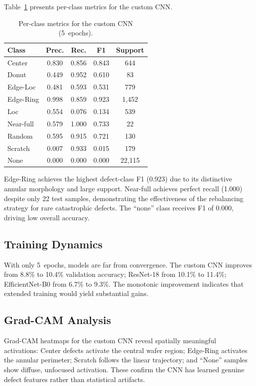 \documentclass[conference]{IEEEtran}
\begin{document}
Table~\ref{tab:per_class} presents per-class metrics for the custom CNN.

\begin{table}[H]
\centering
\caption{Per-class metrics for the custom CNN (5~epochs).}
\label{tab:per_class}
\begin{tabular}{@{}lcccc@{}}
\toprule
\textbf{Class} & \textbf{Prec.} & \textbf{Rec.} & \textbf{F1}
               & \textbf{Support} \\
\midrule
Center      & 0.830 & 0.856 & 0.843 & 644 \\
Donut       & 0.449 & 0.952 & 0.610 & 83 \\
Edge-Loc    & 0.481 & 0.593 & 0.531 & 779 \\
Edge-Ring   & 0.998 & 0.859 & 0.923 & 1{,}452 \\
Loc         & 0.554 & 0.076 & 0.134 & 539 \\
Near-full   & 0.579 & 1.000 & 0.733 & 22 \\
Random      & 0.595 & 0.915 & 0.721 & 130 \\
Scratch     & 0.007 & 0.933 & 0.015 & 179 \\
None        & 0.000 & 0.000 & 0.000 & 22{,}115 \\
\bottomrule
\end{tabular}
\end{table}

Edge-Ring achieves the highest defect-class F1 (0.923) due to its
distinctive annular morphology and large support. Near-full achieves perfect
recall (1.000) despite only 22 test samples, demonstrating the effectiveness
of the rebalancing strategy for rare catastrophic defects. The ``none'' class
receives F1 of 0.000, driving low overall accuracy.

\subsection{Training Dynamics}

With only 5~epochs, models are far from convergence. The custom CNN improves
from 8.8\% to 10.4\% validation accuracy; ResNet-18 from 10.1\% to 11.4\%;
EfficientNet-B0 from 6.7\% to 9.3\%. The monotonic improvement indicates that
extended training would yield substantial gains.

\subsection{Grad-CAM Analysis}

Grad-CAM heatmaps for the custom CNN reveal spatially meaningful activations:
Center defects activate the central wafer region; Edge-Ring activates the
annular perimeter; Scratch follows the linear trajectory; and ``None'' samples
show diffuse, unfocused activation. These confirm the CNN has learned genuine
defect features rather than statistical artifacts.
\end{document}
